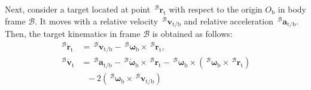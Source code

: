 \documentclass[lettersize,journal]{IEEEtran}
\begin{document}
Next, consider a target located at point $\,^\mathcal{B} \boldsymbol{r}_{\text{t}}$ with respect to the origin $O_{\text{b}}$ in body frame $\mathcal{B}$. It moves with a relative velocity $\,^\mathcal{B} \boldsymbol{v}_{\text{t/b}}$ and relative acceleration $\,^\mathcal{B} \boldsymbol{a}_{\text{t/b}}$. Then, the target kinematics in frame $\mathcal{B}$ is obtained as follows:
\begin{align} \label{target kinematics: equation}
    \,^\mathcal{B} \dot{\boldsymbol{r}}_{\text{t}} &= \,^\mathcal{B} \boldsymbol{v}_{\text{t/b}} - \,^\mathcal{B} \boldsymbol{\omega}_{\text{b}} \times \,^\mathcal{B} \boldsymbol{r}_{\text{t}}, \nonumber \\
    \,^\mathcal{B} \dot{\boldsymbol{v}}_{\text{t}} &= \,^\mathcal{B} \boldsymbol{a}_{\text{t/b}} - \,^\mathcal{B} \dot{\boldsymbol{\omega}}_{\text{b}} \times \,^\mathcal{B} \boldsymbol{r}_{\text{t}} - \,^\mathcal{B} \boldsymbol{\omega}_{\text{b}} \times \left( \,^\mathcal{B} \boldsymbol{\omega}_{\text{b}} \times \,^\mathcal{B} \boldsymbol{r}_{\text{t}} \right) \nonumber \\
    &~~~ - 2 \left( \,^\mathcal{B} \boldsymbol{\omega}_{\text{b}} \times \,^\mathcal{B} \boldsymbol{v}_{\text{t/b}} \right)
\end{align}
\end{document}
